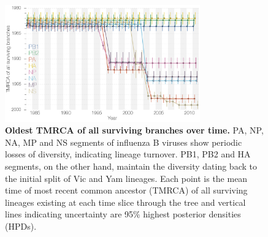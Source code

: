 \documentclass[11pt,oneside,letterpaper]{article}
\begin{document}
\begin{figure}[h]
	\centering		
	\includegraphics[width=0.75\textwidth]{figures/InfB_tmrcaOT_lines.png}
	\caption{\textbf{Oldest TMRCA of all surviving branches over time.}
PA, NP, NA, MP and NS segments of influenza B viruses show periodic losses of diversity, indicating lineage turnover.
PB1, PB2 and HA segments, on the other hand, maintain the diversity dating back to the initial split of Vic and Yam lineages.
Each point is the mean time of most recent common ancestor (TMRCA) of all surviving lineages existing at each time slice through the tree and vertical lines indicating uncertainty are 95\% highest posterior densities (HPDs).}
	\label{tmrcaOT}
\end{figure}
\end{document}
